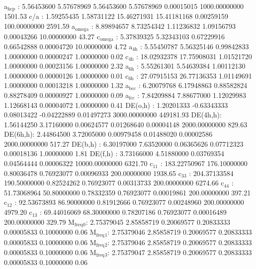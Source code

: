 \documentclass[11pt]{article}
\begin{document}
a\(_{\text{hcp}}\)   :   5.56453600   5.57678969   5.56453600   5.57678969   0.00015015 1000.00000000      1501.53
c/a     :   1.59255435   1.58731122  15.46271931  15.41181168   0.00259159 100.00000000      2591.59
a\(_{\text{omega}}\) :   8.89894657   8.73254342   1.11236832   1.09156793   0.00043266  10.00000000        43.27
c\(_{\text{omega}}\) :   5.37839325   5.32343103   0.67229916   0.66542888   0.00004720  10.00000000         4.72
a\(_{\text{4h}}\)    :   5.55450787   5.56325146   0.99842833   1.00000000   0.00000247   1.00000000         0.02
c\(_{\text{4h}}\)    :  18.02932378  17.75908031   1.01521720   1.00000000   0.00023156   1.00000000         2.32
a\(_{\text{6h}}\)    :   5.55261301   5.54639384   1.00112130   1.00000000   0.00000126   1.00000000         0.01
c\(_{\text{6h}}\)    :  27.07915153  26.77136353   1.01149691   1.00000000   0.00013218   1.00000000         1.32
a\(_{\text{bcc}}\)   :   6.20079768   6.17948863   0.88582824   0.88278409   0.00000927   1.00000000         0.09
a\(_{\text{fcc}}\)   :   7.84209884   7.88677000   1.12029983   1.12668143   0.00004072   1.00000000         0.41
DE(o,h) :   1.20201333  -0.63343333   0.08013422  -0.04222889   0.01497273 3000.00000000    449181.93
DE(4h,h):   1.56144250   3.17160000   0.00624577   0.01268640   0.00004148 2000.00000000       829.63
DE(6h,h):   2.44864500   3.72005000   0.00979458   0.01488020   0.00002586 2000.00000000       517.27
DE(b,h) :   6.30197000   7.63520000   0.06365626   0.07712323   0.00018136   1.00000000         1.81
DE(f,h) :   3.73166000   4.51880000   0.03769354   0.04564444   0.00006322 10000.00000000      6321.70
c\(_{\text{11}}\)    : 183.22750967 176.10000000   0.80036478   0.76923077   0.00096933 200.00000000      1938.65
c\(_{\text{33}}\)    : 204.37133584 190.50000000   0.82524262   0.76923077   0.00313733 200.00000000      6274.66
c\(_{\text{44}}\)    :  51.73068964  50.80000000   0.78332359   0.76923077   0.00019861 200.00000000       397.21
c\(_{\text{12}}\)    :  92.53673893  86.90000000   0.81912666   0.76923077   0.00248960 200.00000000      4979.20
c\(_{\text{13}}\)    :  69.44016069  68.30000000   0.78207186   0.76923077   0.00016489 200.00000000       329.79
M\(_{\text{freq}}\)\(_{\text{0}}\):   2.75379045   2.85858719   0.20069577   0.20833333   0.00005833   0.10000000         0.06
M\(_{\text{freq}}\)\(_{\text{1}}\):   2.75379046   2.85858719   0.20069577   0.20833333   0.00005833   0.10000000         0.06
M\(_{\text{freq}}\)\(_{\text{2}}\):   2.75379046   2.85858719   0.20069577   0.20833333   0.00005833   0.10000000         0.06
M\(_{\text{freq}}\)\(_{\text{3}}\):   2.75379047   2.85858719   0.20069577   0.20833333   0.00005833   0.10000000         0.06
\end{document}
